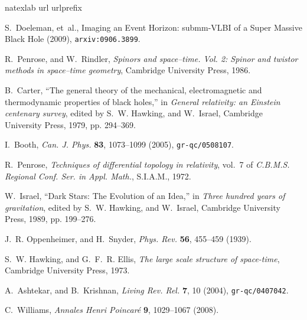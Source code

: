 \documentclass[12pt]{article}
\begin{document}
\begin{thebibliography}{57}
\expandafter\ifx\csname natexlab\endcsname\relax\def\natexlab#1{#1}\fi
\providecommand{\enquote}[1]{``#1''}
\expandafter\ifx\csname url\endcsname\relax
  \def\url#1{\texttt{#1}}\fi
\expandafter\ifx\csname urlprefix\endcsname\relax\def\urlprefix{URL }\fi
\providecommand{\eprint}[2][]{\url{#2}}

S.~Doeleman, et~al., {Imaging an Event Horizon: submm-VLBI of a Super Massive
  Black Hole} (2009), \eprint{arxiv:0906.3899}.

R.~Penrose, and W.~Rindler, \emph{{Spinors and space--time. Vol. 2: Spinor and
  twistor methods in space--time geometry}}, Cambridge University Press, 1986.

B.~Carter, \enquote{The general theory of the mechanical, electromagnetic and
  thermodynamic properties of black holes,} in \emph{General relativity: an
  Einstein centenary survey}, edited by S.~W. Hawking, and W.~Israel, Cambridge
  University Press, 1979, pp. 294--369.

I.~Booth, \emph{Can. J. Phys.} \textbf{83}, 1073--1099 (2005),
  \eprint{gr-qc/0508107}.

R.~Penrose, \emph{Techniques of differential topology in relativity}, vol.~7 of
  \emph{C.B.M.S. Regional Conf. Ser. in Appl. Math.}, S.I.A.M., 1972.

W.~Israel, \enquote{Dark Stars: The Evolution of an Idea,} in \emph{Three
  hundred years of gravitation}, edited by S.~W. Hawking, and W.~Israel,
  Cambridge University Press, 1989, pp. 199--276.

J.~R. Oppenheimer, and H.~Snyder, \emph{Phys. Rev.} \textbf{56}, 455--459
  (1939).

S.~W. Hawking, and G.~F.~R. Ellis, \emph{{The large scale structure of
  space-time}}, Cambridge University Press, 1973.

A.~Ashtekar, and B.~Krishnan, \emph{Living Rev. Rel.} \textbf{7}, 10 (2004),
  \eprint{gr-qc/0407042}.

C.~Williams, \emph{Annales Henri Poincar\'e} \textbf{9}, 1029--1067 (2008).


\end{thebibliography}
\end{document}
